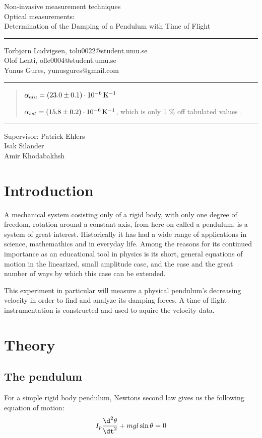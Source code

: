 \documentclass[11pt, a4paper]{article}
\date{\todayswe}
\makeatletter
\def\contacts{Torbjørn Ludvigsen, tolu0022@student.umu.se\\Olof Lenti, olle0004@student.umu.se\\
Yunus Gures, yunusgures@gmail.com}
\def\course{Non-invasive measurement techniques}
\def\lab{Optical measurements:\\Determination of the Damping of a Pendulum with Time of Flight}
\def\supervisors{Patrick Ehlers\\Isak Silander\\ Amir Khodabakhsh}
\makeatother
\begin{document}
\pagestyle{fancy}
\begin{titlepage}
	\begin{center}
		\course\\
		\Large{\lab}\vspace{2mm}
		\hrule\vspace{2mm}
		\tiny{\contacts}\vspace{2mm}
		\hrule
	\end{center}
	\vspace{4mm}

	\begin{abstract}

  $\alpha_{alu} =\unit[(23.0 \pm 0.1)\cdot10^{-6}]{K^{-1}}$ 

  $\alpha_{sst} = \unit[(15.8 \pm 0.2)\cdot10^{-6}]{K^{-1}}$, 
    which is only 1 \% off tabulated values \cite{ph, thex}.

	\end{abstract}
	\vfill
	\hrule\vspace{2mm}
	\centering
		\tiny{Supervisor: \supervisors}
\end{titlepage}

\pagestyle{plain}
\vspace{2cm}
\section{Introduction}
A mechanical system cosisting only of a rigid body, with only one degree of 
freedom, rotation around a constant axis, from here on called a pendulum, is 
a system of great interest. Historically it has had a wide range of
applications in science, mathemathics and in everyday life. Among the reasons for
its continued importance as an educational tool in physics is its short, general 
equations of
motion in the linearized, small amplitude case, and the ease and the great number 
of ways by which this case can be extended.

This experiment in particular will measure a physical pendulum's decreasing velocity
in order to find and analyze its damping forces. A time of flight instrumentation
is constructed and used to aquire the velocity data.

\section{Theory}
\subsection{The pendulum}
For a simple rigid body pendulum, Newtons second law gives us the following
equation of motion:
\begin{equation}
  I_p\frac{\d^2\theta}{\dt^2} + mgl\sin{\theta} = 0
  \label{eq_of_motion}
\end{equation}
\end{document}
